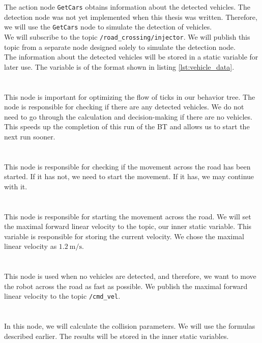         The action node \texttt{GetCars} obtains information about the detected vehicles. The detection node was not yet implemented when this thesis was written. Therefore, we will use the \texttt{GetCars} node to simulate the detection of vehicles.\\
        We will subscribe to the topic \texttt{/road\_crossing/injector}. We will publish this topic from a separate node designed solely to simulate the detection node.\\
        The information about the detected vehicles will be stored in a static variable for later use. The variable is of the format shown in listing \ref{lst:vehicle_data}.\\\\
    \\
        This node is important for optimizing the flow of ticks in our behavior tree. The node is responsible for checking if there are any detected vehicles. We do not need to go through the calculation and decision-making if there are no vehicles. This speeds up the completion of this run of the BT and allows us to start the next run sooner.\\\\
    \\
        This node is responsible for checking if the movement across the road has been started. If it has not, we need to start the movement. If it has, we may continue with it.\\\\
    \\
        This node is responsible for starting the movement across the road. We will set the maximal forward linear velocity to the topic, our inner static variable. This variable is responsible for storing the current velocity. We chose the maximal linear velocity as $1.2\:\si{\m\per\s}$.\\\\
    \\
        This node is used when no vehicles are detected, and therefore, we want to move the robot across the road as fast as possible. We publish the maximal forward linear velocity to the topic \texttt{/cmd\_vel}.\\\\
    \\
        In this node, we will calculate the collision parameters. We will use the formulas described earlier. The results will be stored in the inner static variables.\\
